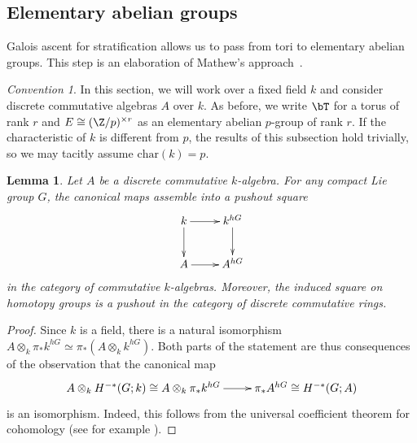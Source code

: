 \documentclass{amsart}%
\numberwithin{equation}{section}%
\newtheorem{Lem}[subsection]{Lemma}
\newtheorem{Cor}[subsection]{Corollary}
\theoremstyle{remark}
\newtheorem{Conv}[subsection]{Convention}
\begin{document}


\subsection{Elementary abelian groups}

Galois ascent for stratification allows us to pass from tori to elementary abelian groups. This step is an elaboration of Mathew's approach~\cite[Sec.~6]{mathew_torus}.

\begin{Conv}
In this section, we will work over a fixed field $k$ and consider discrete commutative algebras $A$ over $k$. As before, we write $\bT$ for a torus of rank $r$ and $E \cong (\Z/p)^{\times r}$ as an elementary abelian $p$-group of rank $r$. If the characteristic of $k$ is different from $p$, the results of this subsection hold trivially, so we may tacitly assume $\mathrm{char}(k) = p$.
\end{Conv}

\begin{Lem}\label{lem:groupcohomologybasechange}
Let $A$ be a discrete commutative $k$-algebra. For any compact Lie group $G$, the canonical maps assemble into a pushout square
\[
\xymatrix{k \ar[r] \ar[d] & k^{hG} \ar[d] \\
A \ar[r] & A^{hG}}
\]
in the category of commutative $k$-algebras. Moreover, the induced square on homotopy groups is a pushout in the category of discrete commutative rings. 
\end{Lem}
\begin{proof}
Since $k$ is a field, there is a natural isomorphism $A \otimes_k \pi_*k^{hG} \simeq \pi_*(A \otimes_k k^{hG})$. Both parts of the statement are thus consequences of the observation that the canonical map
\[
\xymatrix{A\otimes_k H^{-*}(G;k) \cong A \otimes_k \pi_*k^{hG} \ar[r] & \pi_*A^{hG} \cong H^{-*}(G;A)}
\]
is an isomorphism. Indeed, this follows from the universal coefficient theorem for cohomology (see for example \cite[\S5.5, Thm.~11]{Spanier81}).
\end{proof}
\end{document}
